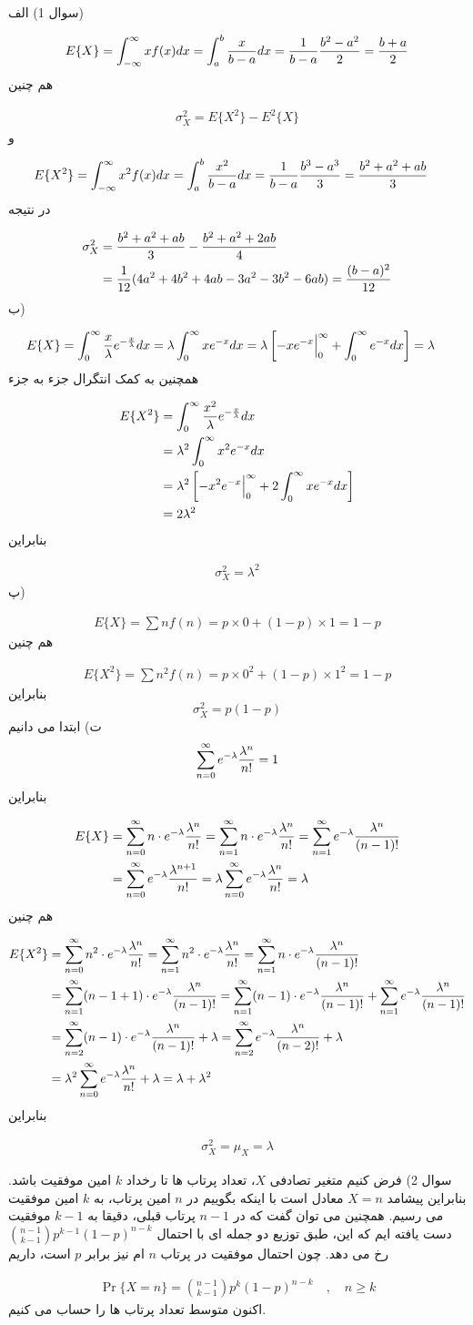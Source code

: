 \documentclass[10pt,letterpaper]{report}
\newcommand{\eqn}[1]{
\[\begin{split}
#1
\end{split}\]
}
\begin{document}
سوال 1) الف)
\eqn{
E\{X\}=\int_{-\infty}^{\infty}{xf(x)}dx
=
\int_{a}^{b}{x\over b-a}dx
=
{1\over b-a}{b^2-a^2\over 2}
=
{b+a\over 2}
}{}
هم چنین
\eqn{
\sigma_X^2=E\{X^2\}-E^2\{X\}
}{}
و
\eqn{
E\{X^2\}&=\int_{-\infty}^{\infty}{x^2f(x)}dx
=
\int_{a}^{b}{x^2\over b-a}dx
=
{1\over b-a}{b^3-a^3\over 3}
=
{b^2+a^2+ab\over 3}
}{}
در نتیجه
\eqn{
\sigma_X^2&={b^2+a^2+ab\over 3}-{b^2+a^2+2ab\over 4}
\\&
={1\over 12}(4a^2+4b^2+4ab-3a^2-3b^2-6ab)
={(b-a)^2\over 12}
}{}
ب)
\eqn{
E\{X\}&=\int_0^\infty {x\over \lambda}e^{-{x\over \lambda}}dx
=
\lambda\int_0^\infty xe^{-x}dx
=
\lambda\left[-xe^{-x}\Big|_0^\infty+\int_0^\infty e^{-x}dx\right]
=
\lambda
}{}
همچنین به کمک انتگرال جزء به جزء
\eqn{
E\{X^2\}&=\int_0^\infty {x^2\over \lambda}e^{-{x\over \lambda}}dx
\\&=
\lambda^2\int_0^\infty x^2e^{-x}dx
\\&=
\lambda^2\left[-x^2e^{-x}\Big|_0^\infty+2\int_0^\infty xe^{-x}dx\right]
\\&=
2\lambda^2
}{}
بنابراین
\eqn{
\sigma_X^2=\lambda^2
}{}
پ)
\eqn{
E\{X\}=\sum nf(n)=p\times 0+(1-p)\times 1=1-p
}{}
هم چنین
\eqn{
E\{X^2\}=\sum n^2f(n)=p\times 0^2+(1-p)\times 1^2=1-p
}{}
بنابراین
$$\sigma_X^2=p(1-p)$$
ت) ابتدا می دانیم
$$
\sum_{n=0}^\infty e^{-\lambda}{\lambda^n\over n!}=1
$$
بنابراین
\eqn{
E\{X\}&=
\sum_{n=0}^\infty n\cdot e^{-\lambda}{\lambda^n\over n!}
=
\sum_{n=1}^\infty n\cdot e^{-\lambda}{\lambda^n\over n!}
=
\sum_{n=1}^\infty e^{-\lambda}{\lambda^n\over (n-1)!}
\\&=
\sum_{n=0}^\infty e^{-\lambda}{\lambda^{n+1}\over n!}
=
\lambda\sum_{n=0}^\infty e^{-\lambda}{\lambda^{n}\over n!}
=\lambda
}{}
هم چنین
\eqn{
E\{X^2\}&=
\sum_{n=0}^\infty n^2\cdot e^{-\lambda}{\lambda^n\over n!}
=
\sum_{n=1}^\infty n^2\cdot e^{-\lambda}{\lambda^n\over n!}
=
\sum_{n=1}^\infty n\cdot e^{-\lambda}{\lambda^n\over (n-1)!}
\\&=
\sum_{n=1}^\infty (n-1+1)\cdot e^{-\lambda}{\lambda^n\over (n-1)!}
=
\sum_{n=1}^\infty (n-1)\cdot e^{-\lambda}{\lambda^n\over (n-1)!}
+
\sum_{n=1}^\infty e^{-\lambda}{\lambda^n\over (n-1)!}
\\&=
\sum_{n=2}^\infty (n-1)\cdot e^{-\lambda}{\lambda^n\over (n-1)!}
+
\lambda
=
\sum_{n=2}^\infty e^{-\lambda}{\lambda^n\over (n-2)!}
+
\lambda
\\&=
\lambda^2\sum_{n=0}^\infty e^{-\lambda}{\lambda^n\over n!}
+
\lambda
=
\lambda+\lambda^2
}{}
بنابراین
\eqn{
\sigma_X^2=\mu_X=\lambda
}{}

سوال 2) فرض کنیم متغیر تصادفی $X$، تعداد پرتاب ها تا رخداد $k$ امین موفقیت  باشد. بنابراین پیشامد $X=n$ معادل است با اینکه بگوییم در $n$ امین پرتاب، به $k$ امین موفقیت می رسیم. همچنین می توان گفت که در $n-1$ پرتاب قبلی، دقیقا به $k-1$ موفقیت دست یافته ایم که این، طبق توزیع دو جمله ای با احتمال 
$
\binom{n-1}{k-1}p^{k-1}(1-p)^{n-k}
$
 رخ می دهد. چون احتمال موفقیت در پرتاب $n$ ام نیز برابر $p$ است، داریم
\eqn{
\Pr\{X=n\}=\binom{n-1}{k-1}p^{k}(1-p)^{n-k}\quad,\quad n\ge k
}{}
اکنون متوسط تعداد پرتاب ها را حساب می کنیم.
\end{document}
